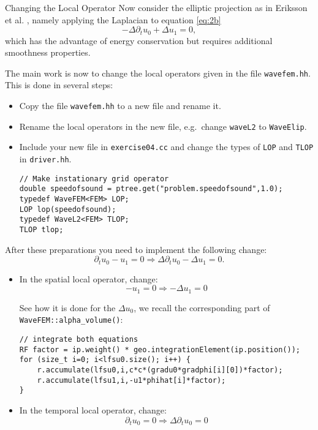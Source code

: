 \documentclass[12pt,a4paper]{article}
\begin{document}
\begin{Exercise}{Changing the Local Operator}
  Now consider the elliptic projection as in Eriksson et
  al. \cite{Eriksson}, namely applying the Laplacian to equation
  \eqref{eq:2b}
  \begin{equation}\label{eq:elip}
    -\Delta \partial_t u_0 + \Delta u_1 = 0,
  \end{equation}
  which has the advantage of energy conservation but requires
  additional smoothness properties.


  The main work is now to change the local operators given in the file
  \lstinline{wavefem.hh}. This is done in several steps:
  \begin{itemize}
  \item Copy the file \lstinline{wavefem.hh} to a new file and rename
    it.
  \item Rename the local operators in the new file, e.g.~change
    \lstinline{waveL2} to \lstinline{WaveElip}.
  \item Include your new file in \lstinline{exercise04.cc} and change
    the types of \lstinline{LOP} and \lstinline{TLOP} in
    \lstinline{driver.hh}.
  \begin{lstlisting}
// Make instationary grid operator
double speedofsound = ptree.get("problem.speedofsound",1.0);
typedef WaveFEM<FEM> LOP;
LOP lop(speedofsound);
typedef WaveL2<FEM> TLOP;
TLOP tlop;
  \end{lstlisting}
  \end{itemize}

  After these preparations you need to implement the following change:
  $$ \partial_t u_0 - u_1 = 0 \Rightarrow \Delta \partial_t u_0 -
  \Delta u_1 = 0.$$

  \begin{itemize}
  \item In the spatial local operator, change:
    $$ - u_1 = 0 \Rightarrow -  \Delta u_1 = 0$$

    See how it is done for the $\Delta u_0$, we recall the
    corresponding part of \lstinline{WaveFEM::alpha_volume()}:
  \begin{lstlisting}
// integrate both equations
RF factor = ip.weight() * geo.integrationElement(ip.position());
for (size_t i=0; i<lfsu0.size(); i++) {
	r.accumulate(lfsu0,i,c*c*(gradu0*gradphi[i][0])*factor);
	r.accumulate(lfsu1,i,-u1*phihat[i]*factor);
}
  \end{lstlisting}

  \item In the temporal local operator, change:
    $$ \partial_t u_0  = 0 \Rightarrow \Delta \partial_t u_0= 0$$


\end{itemize}
\end{Exercise}
\end{document}
